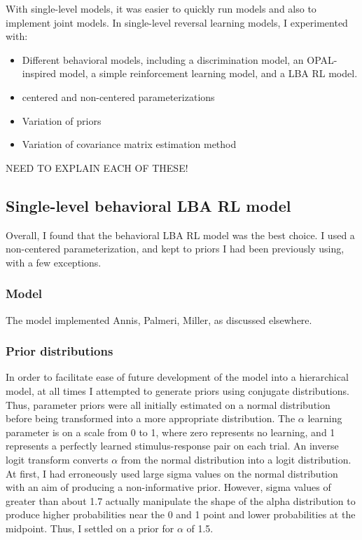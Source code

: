 \documentclass[]{article}
\providecommand{\tightlist}{%
  \setlength{\itemsep}{0pt}\setlength{\parskip}{0pt}}
\begin{document}
With single-level models, it was easier to quickly run models and also
to implement joint models. In single-level reversal learning models, I
experimented with:

\begin{itemize}
\tightlist
\item
  Different behavioral models, including a discrimination model, an
  OPAL-inspired model, a simple reinforcement learning model, and a LBA
  RL model.
\item
  centered and non-centered parameterizations
\item
  Variation of priors
\item
  Variation of covariance matrix estimation method
\end{itemize}

NEED TO EXPLAIN EACH OF THESE!

\subsection{Single-level behavioral LBA RL
model}\label{single-level-behavioral-lba-rl-model}

Overall, I found that the behavioral LBA RL model was the best choice. I
used a non-centered parameterization, and kept to priors I had been
previously using, with a few exceptions.

\subsubsection{Model}\label{model}

The model implemented Annis, Palmeri, Miller, as discussed elsewhere.

\subsubsection{Prior distributions}\label{prior-distributions}

In order to facilitate ease of future development of the model into a
hierarchical model, at all times I attempted to generate priors using
conjugate distributions. Thus, parameter priors were all initially
estimated on a normal distribution before being transformed into a more
appropriate distribution. The \(\alpha\) learning parameter is on a
scale from 0 to 1, where zero represents no learning, and 1 represents a
perfectly learned stimulus-response pair on each trial. An inverse logit
transform converts \(\alpha\) from the normal distribution into a logit
distribution. At first, I had erroneously used large sigma values on the
normal distribution with an aim of producing a non-informative prior.
However, sigma values of greater than about 1.7 actually manipulate the
shape of the alpha distribution to produce higher probabilities near the
0 and 1 point and lower probabilities at the midpoint. Thus, I settled
on a prior for \(\alpha\) of 1.5.
\end{document}
